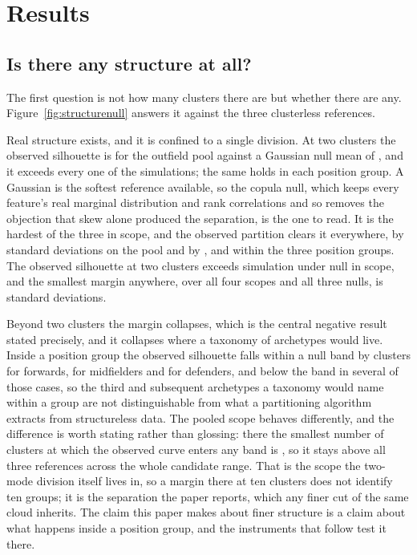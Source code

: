 \section{Results}
\label{sec:results}

\subsection{Is there any structure at all?}
\label{sec:results:structure}

The first question is not how many clusters there are but whether there are any.
Figure~\ref{fig:structurenull} answers it against the three clusterless references.

Real structure exists, and it is confined to a single division. At two clusters the observed
silhouette is \StrObsAll{} for the outfield pool against a Gaussian null mean of \StrNullAll{},
and it exceeds every one of the \StrSimulations{} simulations; the same holds in each position
group. A Gaussian is the softest reference available, so the copula null, which keeps every
feature's real marginal distribution and rank correlations and so removes the objection that skew
alone produced the separation, is the one to read. It is the hardest of the three in \StrCopulaHardestEverywhere{} scope,
and the observed partition clears it everywhere, by \StrZCopulaAll{} standard deviations on the
pool and by \StrZCopulaDF{}, \StrZCopulaMF{} and \StrZCopulaFW{} within the three position
groups. The observed silhouette at two clusters exceeds \StrBeatsEverywhere{} simulation under
\StrBeatsEverywhere{} null in \StrBeatsEverywhere{} scope, and the smallest margin anywhere, over
all four scopes and all three nulls, is \StrMinZOverall{} standard deviations.

Beyond two clusters the margin collapses, which is the central negative result stated
precisely, and it collapses where a taxonomy of archetypes would live. Inside a position group
the observed silhouette falls within a null band by \StrConvergeFWWord{} clusters for forwards,
\StrConvergeMFWord{} for midfielders and \StrConvergeDFWord{} for defenders, and below the band
in several of those cases, so the third and subsequent archetypes a taxonomy would name within a
group are not distinguishable from what a partitioning algorithm extracts from structureless
data. The pooled scope behaves differently, and the difference is worth stating rather than
glossing: there the smallest number of clusters at which the observed
curve enters any band is \StrConvergeAll{}, so it stays above all three references across the
whole candidate range. That is the scope the two-mode division itself lives in, so a
margin there at ten clusters does not identify ten groups; it is the separation the paper
reports, which any finer cut of the same cloud inherits. The claim this paper makes about finer
structure is a claim about what happens inside a position group, and the instruments that follow
test it there.

